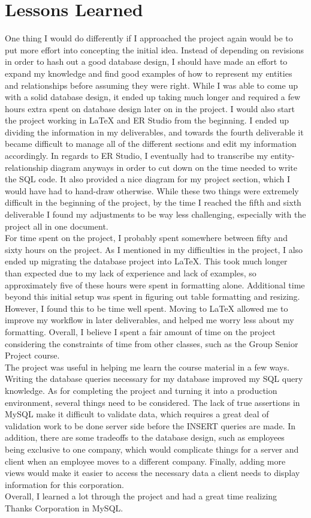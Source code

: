 \documentclass[11pt]{report}
\begin{document}
\chapter{Lessons Learned}
\indent %
\indent One thing I would do differently if I approached the project again would be to put more effort into concepting the initial idea. Instead of depending on revisions in order to hash out a good database design, I should have made an effort to expand my knowledge and find good examples of how to represent my entities and relationships before assuming they were right. While I was able to come up with a solid database design, it ended up taking much longer and required a few hours extra spent on database design later on in the project. I would also start the project working in LaTeX and ER Studio from the beginning. I ended up dividing the information in my deliverables, and towards the fourth deliverable it became difficult to manage all of the different sections and edit my information accordingly. In regards to ER Studio, I eventually had to transcribe my entity-relationship diagram anyways in order to cut down on the time needed to write the SQL code. It also provided a nice diagram for my project section, which I would have had to hand-draw otherwise. While these two things were extremely difficult in the beginning of the project, by the time I reached the fifth and sixth deliverable I found my adjustments to be way less challenging, especially with the project all in one document. \\
\indent For time spent on the project, I probably spent somewhere between fifty and sixty hours on the project. As I mentioned in my difficulties in the project, I also ended up migrating the database project into LaTeX. This took much longer than expected due to my lack of experience and lack of examples, so approximately five of these hours were spent in formatting alone. Additional time beyond this initial setup was spent in figuring out table formatting and resizing. However, I found this to be time well spent. Moving to LaTeX allowed me to improve my workflow in later deliverables, and helped me worry less about my formatting. Overall, I believe I spent a fair amount of time on the project considering the constraints of time from other classes, such as the Group Senior Project course. \\
\indent The project was useful in helping me learn the course material in a few ways. Writing the database queries necessary for my database improved my SQL query knowledge. As for completing the project and turning it into a production environment, several things need to be considered. The lack of true assertions in MySQL make it difficult to validate data, which requires a great deal of validation work to be done server side before the INSERT queries are made. In addition, there are some tradeoffs to the database design, such as employees being exclusive to one company, which would complicate things for a server and client when an employee moves to a different company. Finally, adding more views would make it easier to access the necessary data a client needs to display information for this corporation. \\
\indent Overall, I learned a lot through the project and had a great time realizing Thanks Corporation in MySQL.
\end{document}
